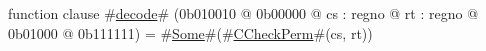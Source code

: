 function clause #\hyperref[zdecode]{decode}# (0b010010 @ 0b00000 @ cs : regno @ rt : regno @    0b01000 @ 0b111111) = #\hyperref[zSome]{Some}#(#\hyperref[zCCheckPerm]{CCheckPerm}#(cs, rt))
